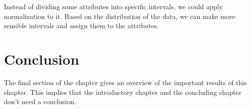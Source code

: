 Instead of dividing some attributes into specific intervals, we could apply normalization to it. Based on the distribution of the data, we can make more sensible intervals and assign them to the attributes.

\section{Conclusion}
The final section of the chapter gives an overview of the important results
of this chapter. This implies that the introductory chapter and the
concluding chapter don't need a conclusion.



